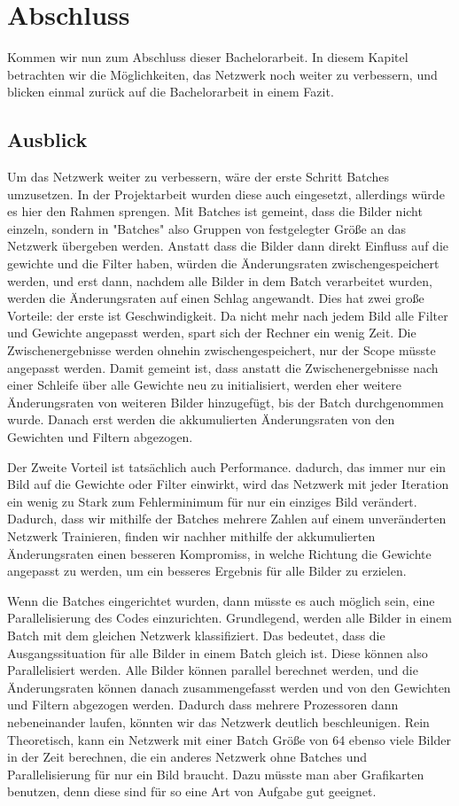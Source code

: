 \documentclass[12pt]{article}
\begin{document}
\section{Abschluss}
Kommen wir nun zum Abschluss dieser Bachelorarbeit. In diesem Kapitel betrachten wir die Möglichkeiten, das Netzwerk noch weiter zu verbessern, und blicken einmal zurück auf die Bachelorarbeit in einem Fazit.

\subsection{Ausblick}
Um das Netzwerk weiter zu verbessern, wäre der erste Schritt Batches umzusetzen. In der Projektarbeit wurden diese auch eingesetzt, allerdings würde es hier den Rahmen sprengen. Mit Batches ist gemeint, dass die Bilder nicht einzeln, sondern in "Batches" also Gruppen von festgelegter Größe an das Netzwerk übergeben werden. Anstatt dass die Bilder dann direkt Einfluss auf die gewichte und die Filter haben, würden die Änderungsraten zwischengespeichert werden, und erst dann, nachdem alle Bilder in dem Batch verarbeitet wurden, werden die Änderungsraten auf einen Schlag angewandt. Dies hat zwei große Vorteile: der erste ist Geschwindigkeit. Da nicht mehr nach jedem Bild alle Filter und Gewichte angepasst werden, spart sich der Rechner ein wenig Zeit. Die Zwischenergebnisse werden ohnehin zwischengespeichert, nur der Scope müsste angepasst werden. Damit gemeint ist, dass anstatt die Zwischenergebnisse nach einer Schleife über alle Gewichte neu zu initialisiert, werden eher weitere Änderungsraten von weiteren Bilder hinzugefügt, bis der Batch durchgenommen wurde. Danach erst werden die akkumulierten Änderungsraten von den Gewichten und Filtern abgezogen.

Der Zweite Vorteil ist tatsächlich auch Performance. dadurch, das immer nur ein Bild auf die Gewichte oder Filter einwirkt, wird das Netzwerk mit jeder Iteration ein wenig zu Stark zum Fehlerminimum für nur ein einziges Bild verändert. Dadurch, dass wir mithilfe der Batches mehrere Zahlen auf einem unveränderten Netzwerk Trainieren, finden wir nachher mithilfe der akkumulierten Änderungsraten einen besseren Kompromiss, in welche Richtung die Gewichte angepasst zu werden, um ein besseres Ergebnis für alle Bilder zu erzielen. 

Wenn die Batches eingerichtet wurden, dann müsste es auch möglich sein, eine Parallelisierung des Codes einzurichten. Grundlegend, werden alle Bilder in einem Batch mit dem gleichen Netzwerk klassifiziert. Das bedeutet, dass die Ausgangssituation für alle Bilder in einem Batch gleich ist. Diese können also Parallelisiert werden. Alle Bilder können parallel berechnet werden, und die Änderungsraten können danach zusammengefasst werden und von den Gewichten und Filtern abgezogen werden. Dadurch dass mehrere Prozessoren dann nebeneinander laufen, könnten wir das Netzwerk deutlich beschleunigen. Rein Theoretisch, kann ein Netzwerk mit einer Batch Größe von 64 ebenso viele Bilder in der Zeit berechnen, die ein anderes Netzwerk ohne Batches und Parallelisierung für nur ein Bild braucht. Dazu müsste man aber Grafikarten benutzen, denn diese sind für so eine Art von Aufgabe gut geeignet. 
\end{document}
